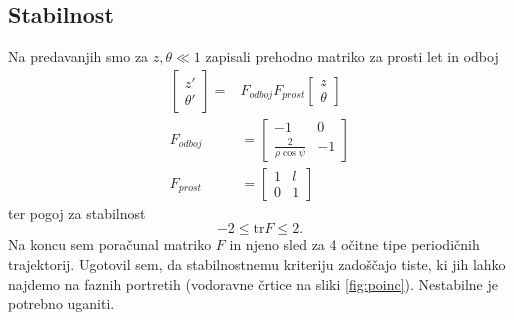 \documentclass[11pt]{article}
\begin{document}
\subsection*{Stabilnost}
Na predavanjih smo za $z, \theta \ll 1$ zapisali prehodno matriko za prosti let in odboj
\begin{equation}
\begin{split}
\begin{bmatrix}
z' \\
\theta'
\end{bmatrix}
 = &
F_{odboj} F_{prost}
\begin{bmatrix}
z \\
\theta
\end{bmatrix} \\
F_{odboj} &=
\begin{bmatrix}
-1 & 0\\
\frac{2}{\rho \cos \psi} & -1
\end{bmatrix} \\
F_{prost} &=
\begin{bmatrix}
1 & l\\
0 & 1
\end{bmatrix}
\end{split}
\end{equation}
ter pogoj za stabilnost
\begin{equation}
-2 \le \text{tr} F \le 2.
\end{equation}
Na koncu sem poračunal matriko $F$ in njeno sled za 4 očitne tipe periodičnih trajektorij.
Ugotovil sem, da stabilnostnemu kriteriju zadoščajo tiste, ki jih lahko najdemo na faznih portretih (vodoravne črtice na sliki \ref{fig:poinc}).
Nestabilne je potrebno uganiti.
\end{document}
